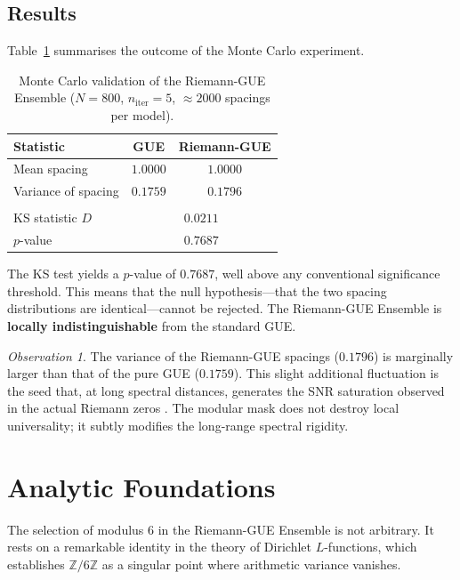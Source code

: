 \documentclass[12pt,a4paper]{article}
\theoremstyle{plain}
\theoremstyle{definition}
\theoremstyle{remark}
\newtheorem{observation}[theorem]{Observation}
\begin{document}
\subsection{Results}
Table~\ref{tab:monte_carlo} summarises the outcome of the Monte Carlo experiment.

\begin{table}[H]
\centering
\caption{Monte Carlo validation of the Riemann-GUE Ensemble ($N=800$, $n_{\text{iter}}=5$, $\approx 2000$ spacings per model).}
\label{tab:monte_carlo}
\begin{tabular}{@{}lcc@{}}
\toprule
\textbf{Statistic} & \textbf{GUE} & \textbf{Riemann-GUE} \\
\midrule
Mean spacing & $1.0000$ & $1.0000$ \\
Variance of spacing & $0.1759$ & $0.1796$ \\
\addlinespace
\multicolumn{3}{c}{\textbf{Two-sample KS test}} \\
KS statistic $D$ & \multicolumn{2}{c}{$0.0211$} \\
$p$-value & \multicolumn{2}{c}{$0.7687$} \\
\bottomrule
\end{tabular}
\end{table}

The KS test yields a $p$-value of $0.7687$, well above any conventional significance threshold. This means that the null hypothesis---that the two spacing distributions are identical---cannot be rejected. The Riemann-GUE Ensemble is \textbf{locally indistinguishable} from the standard GUE.

\begin{observation}
The variance of the Riemann-GUE spacings ($0.1796$) is marginally larger than that of the pure GUE ($0.1759$). This slight additional fluctuation is the seed that, at long spectral distances, generates the SNR saturation observed in the actual Riemann zeros \cite{R1}. The modular mask does not destroy local universality; it subtly modifies the long-range spectral rigidity.
\end{observation}

\section{Analytic Foundations}
\label{sec:analytic}

The selection of modulus $6$ in the Riemann-GUE Ensemble is not arbitrary. It rests on a remarkable identity in the theory of Dirichlet $L$-functions, which establishes $\mathbb{Z}/6\mathbb{Z}$ as a singular point where arithmetic variance vanishes.
\end{document}
